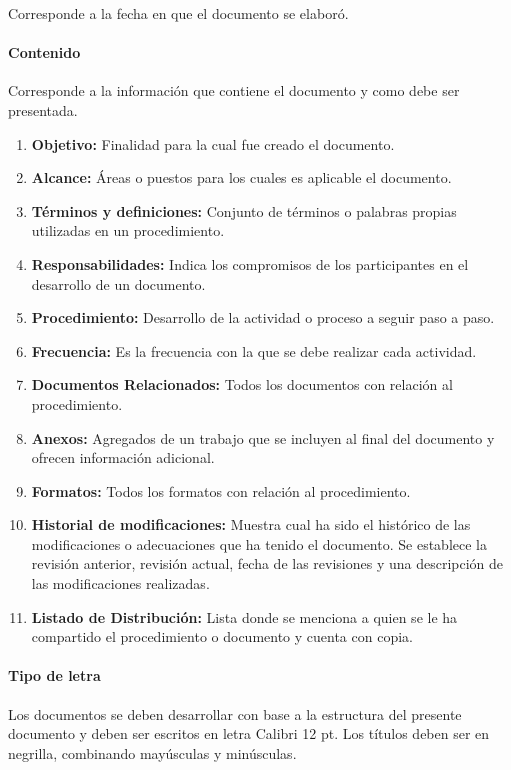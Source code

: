 Corresponde a la fecha en que el documento se elaboró.

\paragraph{Contenido}

Corresponde a la información que contiene el documento y como debe ser presentada.

\begin{enumerate}
	\item \textbf{Objetivo:} Finalidad para la cual fue creado el documento.
	\item \textbf{Alcance:} Áreas o puestos para los cuales es aplicable el documento.
	\item \textbf{Términos y definiciones:} Conjunto de términos o palabras propias utilizadas en un procedimiento.
	\item \textbf{Responsabilidades:} Indica los compromisos de los participantes en el desarrollo de un documento.
	\item \textbf{Procedimiento:} Desarrollo de la actividad o proceso a seguir paso a paso.
	\item \textbf{Frecuencia:} Es la frecuencia con la que se debe realizar cada actividad.
	\item \textbf{Documentos Relacionados:} Todos los documentos con relación al procedimiento.
	\item \textbf{Anexos:} Agregados de un trabajo que se incluyen al final del documento y ofrecen información adicional.
	\item \textbf{Formatos:} Todos los formatos con relación al procedimiento.
	\item \textbf{Historial de modificaciones:} Muestra cual ha sido el histórico de las modificaciones o adecuaciones que ha tenido el documento. Se establece la revisión anterior, revisión actual, fecha de las revisiones y una descripción de las modificaciones realizadas.
	\item \textbf{Listado de Distribución:} Lista donde se menciona a quien se le ha compartido el procedimiento o documento y cuenta con copia.
\end{enumerate}

\paragraph{Tipo de letra}

Los documentos se deben desarrollar con base a la estructura del presente documento y deben ser escritos en letra Calibri 12 pt. Los títulos deben ser en negrilla, combinando mayúsculas y minúsculas.

